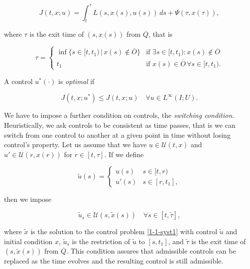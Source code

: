 \begin{equation}\label{1-1-payoff1}
    J(t,x;u) = \int_t^{\tau}L(s,x(s),u(s)) \,ds + \Psi(\tau, x(\tau)),
\end{equation}

where $\tau$ is the exit time of $(s,x(s))$ from $\overline{Q}$, that is

\begin{equation}\label{1-1-taudef}
    \tau = \begin{cases}
        \inf\{s\in [t,t_1)\,|\, x(s)\notin \overline{O}\} & \text{if } \exists s\in [t,t_1): x(s)\notin\overline{O} \\
        t_1 & \text{if }  x(s)\in\overline{O}\,\forall s\in [t,t_1).
    \end{cases}
\end{equation}

A control $u^{\ast}(\cdot)$ is \textit{optimal} if

\begin{equation}\label{1-1-optimalcondition}
    J(t,x;u^{\ast}) \leq J(t,x;u) \quad \forall u\in L^{\infty}(I;U).
\end{equation}

We have to impose a further condition on controls, the \textit{switching condition}. Heuristically, we ask controls to be consistent as time passes, that is we can switch from one control to another at a given point in time without losing control's property. 
Let us assume that we have $u\in\mathcal{U}(t,x)$ and $u'\in\mathcal{U}(r,x(r))$ for $r\in[t,\tau]$. If we define

\begin{equation}\label{1-1-switcond}
    \tilde{u}(s)=\begin{cases}
        u(s) & s\in[t,r) \\
        u'(s) & s\in[r,t_1],
    \end{cases}
\end{equation}

then we impose

\begin{equation}
    \tilde{u}_s\in\mathcal{U}(s,\tilde{x}(s)) \quad \forall s\in[t,\tilde{\tau}],
\end{equation}

where $\tilde{x}$ is the solution to the control problem \eqref{1-1-syst1} with control $\tilde{u}$ and initial condition $x$, 
$\tilde{u}_s$ is the restriction of $\tilde{u}$ to $[s,t_1]$, and $\tilde{\tau}$ is the exit time of $(s,\tilde{x}(s))$ from $\overline{Q}$.
This condition assures that admissible controls can be replaced as the time evolves and the resulting control is still admissible. 